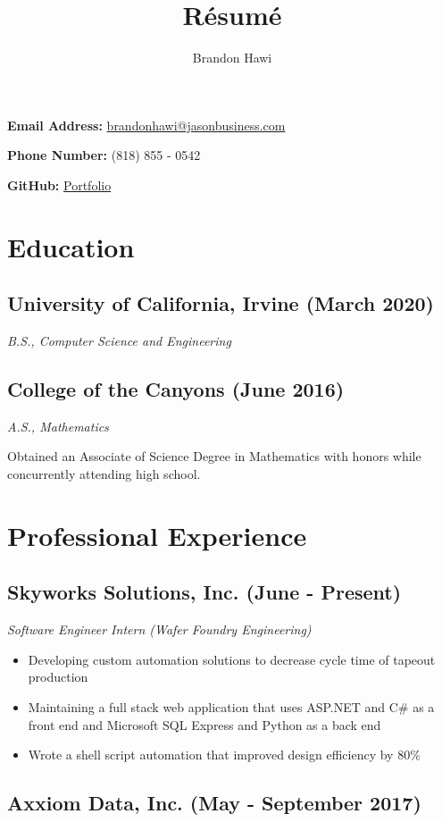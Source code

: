 \documentclass[10pt]{article}
\makeatletter
\renewcommand{\maketitle}
{
\begin{flushleft}
\huge
\textbf{\theauthor}
\small

\textbf{Email Address: }\href{mailto:brandonhawi@jasonbusiness.com}{brandonhawi@jasonbusiness.com}

\textbf{Phone Number: }(818) 855 - 0542

\textbf{GitHub: }\href{https://github.com/brandonhawii}{Portfolio}
\end{flushleft}
}
\makeatother
\begin{document}
\title{R\'esum\'e}
\author{Brandon Hawi}

\maketitle
\vspace{-0.1in}
\section{Education}

\subsection{University of California, Irvine (March 2020)}
\noindent\textit{B.S., Computer Science and Engineering}

\subsection{College of the Canyons (June 2016)}
\noindent\textit{A.S., Mathematics}

Obtained an Associate of Science Degree in Mathematics with honors while concurrently attending
high school.

\section{Professional Experience}

\subsection{Skyworks Solutions, Inc. (June - Present)}

\noindent\textit{Software Engineer Intern (Wafer Foundry Engineering)}

\begin{itemize}
	\setlength\itemsep{0em}
	\item Developing custom automation solutions to decrease cycle time of tapeout production
	\item Maintaining a full stack web application that uses ASP.NET and C\# as a front end and Microsoft SQL Express and Python as a back end
	\item Wrote a shell script automation that improved design efficiency by 80\%
\end{itemize}

\subsection{Axxiom Data, Inc. (May - September 2017)}
\end{document}
